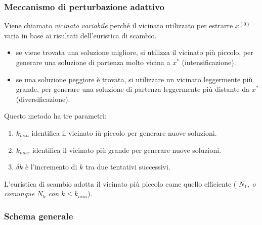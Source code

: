\documentclass{article}
\begin{document}
\subsubsection{Meccanismo di perturbazione adattivo}
Viene chiamato \textit{vicinato variabile} perché il vicinato utilizzato per estrarre $x^{(0)}$
varia in base ai risultati dell'euristica di scambio.
\begin{itemize}
    \item se viene trovata una soluzione migliore, si utilizza il vicinato più piccolo,
    per generare una soluzione di partenza molto vicina a $x^*$ (intensificazione).
    \item se una soluzione peggiore è trovata, si utilizzare un vicinato leggermente più grande,
    per generare una soluzione di partenza leggermente più distante da $x^*$ (diversificazione).
\end{itemize}

Questo metodo ha tre parametri:
\begin{enumerate}
    \item $k_{min}$ identifica il vicinato iù piccolo per generare nuove soluzioni.
    \item $k_{max}$ identifica il vicinato più grande per generare nuove soluzioni.
    \item $\delta k$ è l'incremento di $k$ tra due tentativi successivi.
\end{enumerate}
L'euristica di scambio adotta il vicinato più piccolo come quello efficiente (\textit{
    $N_1$, o comunque $N_k$ con $k\leq k_{min}$}).

\subsubsection{Schema generale}
\end{document}
